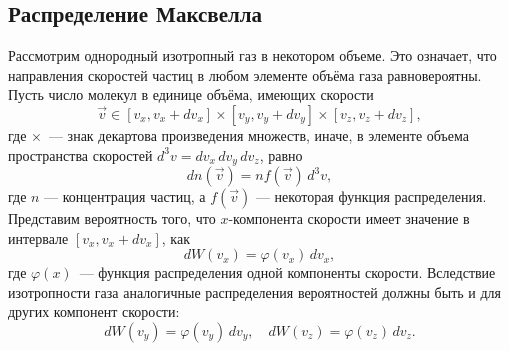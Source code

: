 \subsection{Распределение Максвелла}

Рассмотрим однородный изотропный газ в некотором объеме. Это означает, что направления скоростей частиц в любом элементе объ­ёма газа равновероятны. Пусть число молекул в единице объёма, имеющих скорости
\begin{equation*}
	\vec{v} \in [v_x, v_x + d v_x] \times [v_y, v_y + d v_y] \times [v_z, v_z + d v_z],
\end{equation*}
где $\times$~--- знак декартова произведения множеств, иначе, в элементе объема пространства скоростей $d^3 v = d v_x \, d v_y \, d v_z$, равно
\begin{equation*}
	d n(\vec{v}) = n f(\vec{v}) \, d^3 v,
\end{equation*}
где $n$ — концентрация частиц, а $f(\vec{v})$ — некоторая функция распределения.
Представим вероятность того, что $x$-компонента скорости имеет значение в интервале $[v_x, v_x + d v_x]$, как
\begin{equation*}
	d W (v_x) = \varphi(v_x) \, d v_x,
\end{equation*}
где $\varphi(x)$~--- функция распределения одной компоненты скорости. Вследствие изотропности газа аналогичные распределения вероятностей должны быть и для других компонент скорости:
\begin{equation*}
	d W(v_y) = \varphi(v_y) \, d v_y, \quad 
	d W(v_z) =\varphi(v_z) \, d v_z.
\end{equation*}

